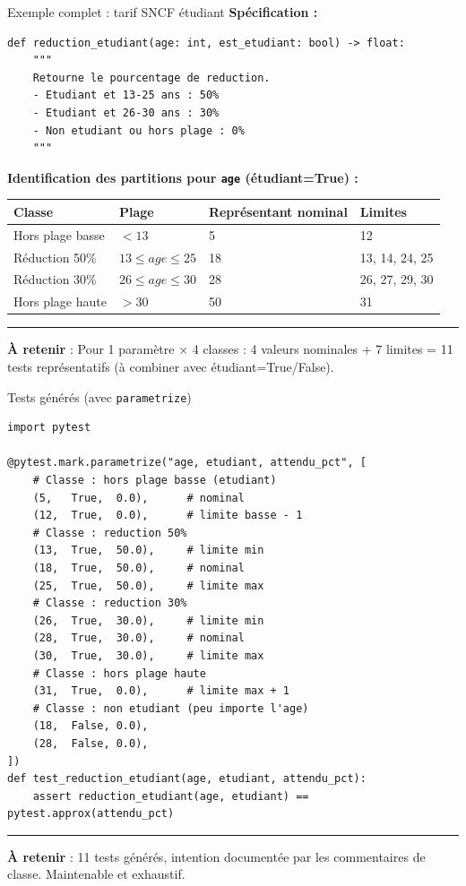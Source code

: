 \documentclass[aspectratio=169,11pt]{beamer}
\newcommand{\takeaway}[1]{%
\vfill\begin{beamercolorbox}[wd=\linewidth,sep=0.4em]{}
\color{accent2}\rule[0.6ex]{1.2em}{1.2pt}\hspace{0.4em}%
\textbf{\color{accent2}\small À retenir} \textcolor{textsoft}{:} %
{\small\color{textmain}#1}
\end{beamercolorbox}}
\begin{document}
\begin{frame}[fragile,t,shrink=12]{Exemple complet : tarif SNCF \'etudiant}
\textbf{Spécification :}
\begin{lstlisting}[style=pythondark]
def reduction_etudiant(age: int, est_etudiant: bool) -> float:
    """
    Retourne le pourcentage de reduction.
    - Etudiant et 13-25 ans : 50%
    - Etudiant et 26-30 ans : 30%
    - Non etudiant ou hors plage : 0%
    """
\end{lstlisting}
\vspace{0.3cm}
\footnotesize
\textbf{Identification des partitions pour \texttt{age} (étudiant=True) :}\\[0.2em]
\begin{tabular}{@{}p{3.0cm} p{2.4cm} p{3.4cm} p{3.6cm}@{}}
\toprule
\textbf{Classe} & \textbf{Plage} & \textbf{Représentant nominal} & \textbf{Limites} \\
\midrule
Hors plage basse & $< 13$ & 5 & 12 \\
Réduction 50\% & $13 \le age \le 25$ & 18 & 13, 14, 24, 25 \\
Réduction 30\% & $26 \le age \le 30$ & 28 & 26, 27, 29, 30 \\
Hors plage haute & $> 30$ & 50 & 31 \\
\bottomrule
\end{tabular}
\takeaway{Pour 1 paramètre × 4 classes : 4 valeurs nominales + 7 limites = 11 tests représentatifs (à combiner avec étudiant=True/False).}
\end{frame}

\begin{frame}[fragile,t,shrink=10]{Tests g\'en\'er\'es (avec \texttt{parametrize})}
\begin{lstlisting}[style=pythondark]
import pytest

@pytest.mark.parametrize("age, etudiant, attendu_pct", [
    # Classe : hors plage basse (etudiant)
    (5,   True,  0.0),      # nominal
    (12,  True,  0.0),      # limite basse - 1
    # Classe : reduction 50%
    (13,  True,  50.0),     # limite min
    (18,  True,  50.0),     # nominal
    (25,  True,  50.0),     # limite max
    # Classe : reduction 30%
    (26,  True,  30.0),     # limite min
    (28,  True,  30.0),     # nominal
    (30,  True,  30.0),     # limite max
    # Classe : hors plage haute
    (31,  True,  0.0),      # limite max + 1
    # Classe : non etudiant (peu importe l'age)
    (18,  False, 0.0),
    (28,  False, 0.0),
])
def test_reduction_etudiant(age, etudiant, attendu_pct):
    assert reduction_etudiant(age, etudiant) == pytest.approx(attendu_pct)
\end{lstlisting}
\takeaway{11 tests générés, intention documentée par les commentaires de classe. Maintenable et exhaustif.}
\end{frame}
\end{document}
